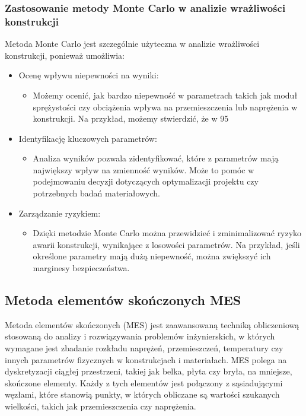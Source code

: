 \subsubsection*{Zastosowanie metody Monte Carlo w analizie wrażliwości konstrukcji}
Metoda Monte Carlo jest szczególnie użyteczna w analizie wrażliwości konstrukcji, ponieważ umożliwia:

\begin{itemize}
\item Ocenę wpływu niepewności na wyniki:

\begin{itemize}
\item Możemy ocenić, jak bardzo niepewność w parametrach takich jak moduł sprężystości czy obciążenia wpływa na przemieszczenia lub naprężenia w konstrukcji. Na przykład, możemy stwierdzić, że w 95%
\end{itemize}

\item Identyfikację kluczowych parametrów:

\begin{itemize}
\item Analiza wyników pozwala zidentyfikować, które z parametrów mają największy wpływ na zmienność wyników. Może to pomóc w podejmowaniu decyzji dotyczących optymalizacji projektu czy potrzebnych badań materiałowych.
\end{itemize}

\item Zarządzanie ryzykiem:

\begin{itemize}
    \item Dzięki metodzie Monte Carlo można przewidzieć i zminimalizować ryzyko awarii konstrukcji, wynikające z losowości parametrów. Na przykład, jeśli określone parametry mają dużą niepewność, można zwiększyć ich marginesy bezpieczeństwa.
\end{itemize}

\end{itemize}

\subsection{Metoda elementów skończonych MES}

Metoda elementów skończonych (MES) jest zaawansowaną techniką obliczeniową stosowaną do analizy i rozwiązywania problemów inżynierskich, w których wymagane jest zbadanie rozkładu naprężeń, przemieszczeń, temperatury czy innych parametrów fizycznych w konstrukcjach i materiałach.
MES polega na dyskretyzacji ciągłej przestrzeni, takiej jak belka, płyta czy bryła, na mniejsze, skończone elementy.
Każdy z tych elementów jest połączony z sąsiadującymi węzłami, które stanowią punkty, w których obliczane są wartości szukanych wielkości, takich jak przemieszczenia czy naprężenia.

